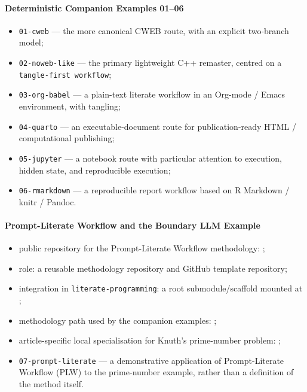 \documentclass{ZGJournalArticle_2026}
\providecommand{\tightlist}{%
  \setlength{\itemsep}{0pt}\setlength{\parskip}{0pt}}
\begin{document}
\paragraph{Deterministic Companion Examples
01--06}\label{deterministic-companion-examples-0106}

\begin{itemize}
\tightlist
\item
  \texttt{01-cweb} --- the more canonical CWEB route, with an explicit
  two-branch {} model;
\item
  \texttt{02-noweb-like} --- the primary lightweight C++ remaster,
  centred on a \texttt{tangle-first\ workflow};
\item
  \texttt{03-org-babel} --- a plain-text literate workflow in an
  Org-mode / Emacs environment, with tangling;
\item
  \texttt{04-quarto} --- an executable-document route for
  publication-ready HTML / computational publishing;
\item
  \texttt{05-jupyter} --- a notebook route with particular attention to
  execution, hidden state, and reproducible execution;
\item
  \texttt{06-rmarkdown} --- a reproducible report workflow based on R
  Markdown / knitr / Pandoc.
\end{itemize}

\paragraph{Prompt-Literate Workflow and the Boundary LLM
Example}\label{prompt-literate-workflow-and-the-boundary-llm-example}

\begin{itemize}
\tightlist
\item
  public repository for the Prompt-Literate Workflow methodology:
  {};
\item
  role: a reusable methodology repository and GitHub template
  repository;
\item
  integration in \texttt{literate-programming}: a root
  submodule/scaffold mounted at
  {};
\item
  methodology path used by the companion examples:
  {};
\item
  article-specific local specialisation for Knuth's prime-number
  problem:
  {};
\item
  \texttt{07-prompt-literate} --- a demonstrative application of
  Prompt-Literate Workflow (PLW) to the prime-number example, rather
  than a definition of the method itself.
\end{itemize}
\end{document}
